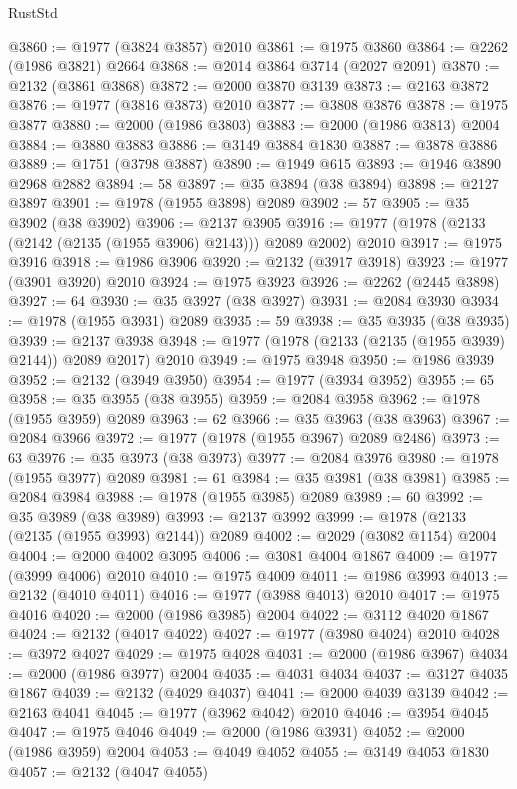 \begin{lexlean}{RustStd}
\begin{coremodule}
@3860 := @1977 (@3824 @3857) @2010
@3861 := @1975 @3860
@3864 := @2262 (@1986 @3821) @2664
@3868 := @2014 @3864 @3714 (@2027 @2091)
@3870 := @2132 (@3861 @3868)
@3872 := @2000 @3870 @3139
@3873 := @2163 @3872
@3876 := @1977 (@3816 @3873) @2010
@3877 := @3808 @3876
@3878 := @1975 @3877
@3880 := @2000 (@1986 @3803)
@3883 := @2000 (@1986 @3813) @2004
@3884 := @3880 @3883
@3886 := @3149 @3884 @1830
@3887 := @3878 @3886
@3889 := @1751 (@3798 @3887)
@3890 := @1949 @615
@3893 := @1946 @3890 @2968 @2882
@3894 := 58
@3897 := @35 @3894 (@38 @3894)
@3898 := @2127 @3897
@3901 := @1978 (@1955 @3898) @2089
@3902 := 57
@3905 := @35 @3902 (@38 @3902)
@3906 := @2137 @3905
@3916 := @1977 (@1978 (@2133 (@2142 (@2135 (@1955 @3906) @2143))) @2089 @2002) @2010
@3917 := @1975 @3916
@3918 := @1986 @3906
@3920 := @2132 (@3917 @3918)
@3923 := @1977 (@3901 @3920) @2010
@3924 := @1975 @3923
@3926 := @2262 (@2445 @3898)
@3927 := 64
@3930 := @35 @3927 (@38 @3927)
@3931 := @2084 @3930
@3934 := @1978 (@1955 @3931) @2089
@3935 := 59
@3938 := @35 @3935 (@38 @3935)
@3939 := @2137 @3938
@3948 := @1977 (@1978 (@2133 (@2135 (@1955 @3939) @2144)) @2089 @2017) @2010
@3949 := @1975 @3948
@3950 := @1986 @3939
@3952 := @2132 (@3949 @3950)
@3954 := @1977 (@3934 @3952)
@3955 := 65
@3958 := @35 @3955 (@38 @3955)
@3959 := @2084 @3958
@3962 := @1978 (@1955 @3959) @2089
@3963 := 62
@3966 := @35 @3963 (@38 @3963)
@3967 := @2084 @3966
@3972 := @1977 (@1978 (@1955 @3967) @2089 @2486)
@3973 := 63
@3976 := @35 @3973 (@38 @3973)
@3977 := @2084 @3976
@3980 := @1978 (@1955 @3977) @2089
@3981 := 61
@3984 := @35 @3981 (@38 @3981)
@3985 := @2084 @3984
@3988 := @1978 (@1955 @3985) @2089
@3989 := 60
@3992 := @35 @3989 (@38 @3989)
@3993 := @2137 @3992
@3999 := @1978 (@2133 (@2135 (@1955 @3993) @2144)) @2089
@4002 := @2029 (@3082 @1154) @2004
@4004 := @2000 @4002 @3095
@4006 := @3081 @4004 @1867
@4009 := @1977 (@3999 @4006) @2010
@4010 := @1975 @4009
@4011 := @1986 @3993
@4013 := @2132 (@4010 @4011)
@4016 := @1977 (@3988 @4013) @2010
@4017 := @1975 @4016
@4020 := @2000 (@1986 @3985) @2004
@4022 := @3112 @4020 @1867
@4024 := @2132 (@4017 @4022)
@4027 := @1977 (@3980 @4024) @2010
@4028 := @3972 @4027
@4029 := @1975 @4028
@4031 := @2000 (@1986 @3967)
@4034 := @2000 (@1986 @3977) @2004
@4035 := @4031 @4034
@4037 := @3127 @4035 @1867
@4039 := @2132 (@4029 @4037)
@4041 := @2000 @4039 @3139
@4042 := @2163 @4041
@4045 := @1977 (@3962 @4042) @2010
@4046 := @3954 @4045
@4047 := @1975 @4046
@4049 := @2000 (@1986 @3931)
@4052 := @2000 (@1986 @3959) @2004
@4053 := @4049 @4052
@4055 := @3149 @4053 @1830
@4057 := @2132 (@4047 @4055)

\end{coremodule}
\end{lexlean}
